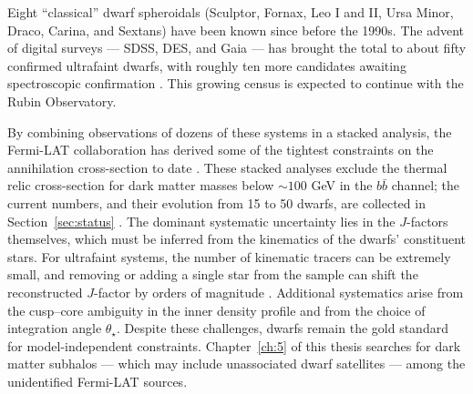 Eight ``classical'' dwarf spheroidals (Sculptor, Fornax, Leo I and II, Ursa Minor, Draco, Carina, and Sextans) have been known since before the 1990s.
The advent of digital surveys --- SDSS, DES, and Gaia --- has brought the total to about fifty confirmed ultrafaint dwarfs, with roughly ten more candidates awaiting spectroscopic confirmation \cite{Pace:2024sys}.
This growing census is expected to continue with the Rubin Observatory.

By combining observations of dozens of these systems in a stacked analysis, the Fermi-LAT collaboration has derived some of the tightest constraints on the annihilation cross-section to date \cite{Fermi-LAT:2015att,2024PhRvD.109f3024M}.
These stacked analyses exclude the thermal relic cross-section for dark matter masses below $\sim 100$ GeV in the $b\bar{b}$ channel; the current numbers, and their evolution from 15 to 50 dwarfs, are collected in Section~\ref{sec:status} \cite{Fermi-LAT:2015att,2024PhRvD.109f3024M}.
The dominant systematic uncertainty lies in the $J$-factors themselves, which must be inferred from the kinematics of the dwarfs' constituent stars.
For ultrafaint systems, the number of kinematic tracers can be extremely small, and removing or adding a single star from the sample can shift the reconstructed $J$-factor by orders of magnitude \cite{Cirelli:2024ssz}.
Additional systematics arise from the cusp--core ambiguity in the inner density profile and from the choice of integration angle $\theta_\star$.
Despite these challenges, dwarfs remain the gold standard for model-independent constraints.
Chapter~\ref{ch:5} of this thesis searches for dark matter subhalos --- which may include unassociated dwarf satellites --- among the unidentified Fermi-LAT sources.

